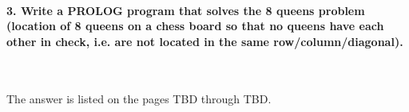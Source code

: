 \documentclass{article}
\begin{document}
	
\paragraph{}\
\paragraph{}\
\paragraph{}\
\paragraph{}\
\paragraph{}\


	
	\rmfamily
	
	\paragraph{3. Write a PROLOG program that solves the 8 queens problem (location of 8 queens on a chess board so that no queens have each other in check, i.e. are not located in the same row/column/diagonal). }\
	\newline
	\rmfamily\
	
	The answer is listed on the pages TBD through TBD.
	
	

		
\end{document}
